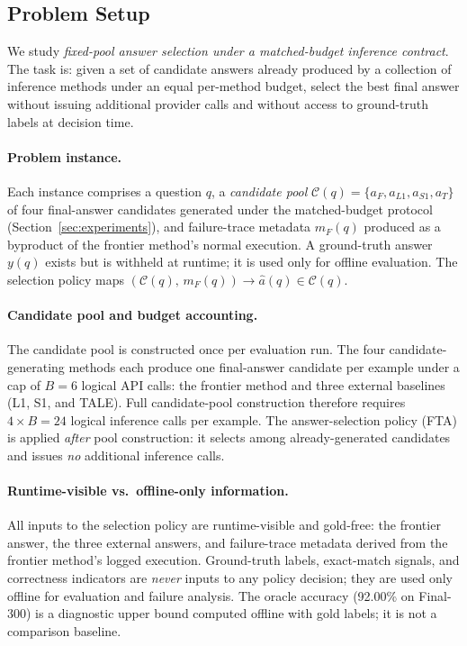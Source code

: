 \subsection{Problem Setup}
\label{sec:problem_setup}

We study \emph{fixed-pool answer selection under a matched-budget inference
contract}.
The task is: given a set of candidate answers already produced by a collection
of inference methods under an equal per-method budget, select the best final
answer without issuing additional provider calls and without access to
ground-truth labels at decision time.

\paragraph{Problem instance.}
Each instance comprises a question $q$, a \emph{candidate pool}
$\mathcal{C}(q) = \{a_F, a_{L1}, a_{S1}, a_{T}\}$ of four final-answer
candidates generated under the matched-budget protocol
(Section~\ref{sec:experiments}), and failure-trace metadata $m_F(q)$ produced
as a byproduct of the frontier method's normal execution.
A ground-truth answer $y(q)$ exists but is withheld at runtime; it is used only
for offline evaluation.
The selection policy maps $(\mathcal{C}(q),\, m_F(q)) \to \hat{a}(q) \in
\mathcal{C}(q)$.

\paragraph{Candidate pool and budget accounting.}
The candidate pool is constructed once per evaluation run.
The four candidate-generating methods each produce one final-answer candidate per
example under a cap of $B = 6$ logical API calls: the frontier method and three
external baselines (L1, S1, and TALE).
Full candidate-pool construction therefore requires $4 \times B = 24$ logical
inference calls per example.
The answer-selection policy (FTA) is applied \emph{after} pool construction:
it selects among already-generated candidates and issues \emph{no} additional
inference calls.

\paragraph{Runtime-visible vs.\ offline-only information.}
All inputs to the selection policy are runtime-visible and gold-free: the
frontier answer, the three external answers, and failure-trace metadata derived
from the frontier method's logged execution.
Ground-truth labels, exact-match signals, and correctness indicators are
\emph{never} inputs to any policy decision; they are used only offline for
evaluation and failure analysis.
The oracle accuracy (92.00\% on Final-300) is a diagnostic upper bound computed
offline with gold labels; it is not a comparison baseline.

